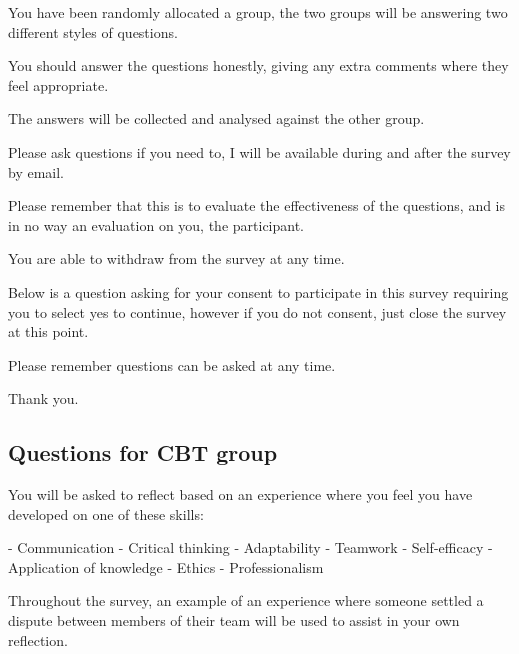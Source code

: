 \documentclass{l4proj}
\begin{document}
\begin{appendices}
You have been randomly allocated a group, the two groups will be answering two different styles of questions. 

You should answer the questions honestly, giving any extra comments where they feel appropriate.

The answers will be collected and analysed against the other group. 

Please ask questions if you need to, I will be available during and after the survey by email.

Please remember that this is to evaluate the effectiveness of the questions, and is in no way an evaluation on you, the participant.

You are able to withdraw from the survey at any time.

Below is a question asking for your consent to participate in this survey requiring you to select yes to continue, however if you do not consent, just close the survey at this point.

Please remember questions can be asked at any time.


Thank you.

\subsection{Questions for CBT group}

You will be asked to reflect based on an experience where you feel you have developed on one of these skills:

- Communication
- Critical thinking
- Adaptability
- Teamwork
- Self-efficacy
- Application of knowledge
- Ethics
- Professionalism 

Throughout the survey, an example of an experience where someone settled a dispute between members of their team will be used to assist in your own reflection.


\end{appendices}
\end{document}
